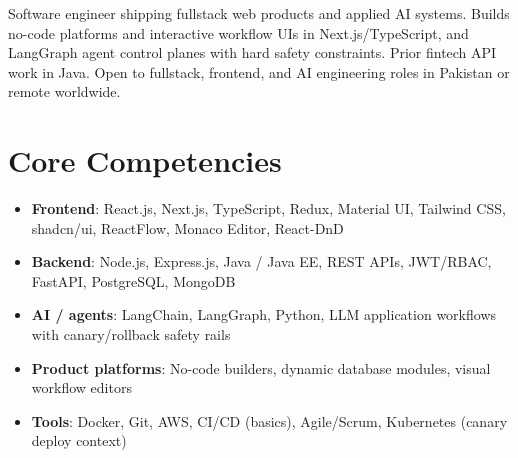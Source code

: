 \documentclass[11pt,a4paper,sans]{moderncv}
\begin{document}
\makecvtitle

\vspace{6pt}
\small{Software engineer shipping fullstack web products and applied AI systems. Builds no-code platforms and interactive workflow UIs in Next.js/TypeScript, and LangGraph agent control planes with hard safety constraints. Prior fintech API work in Java. Open to fullstack, frontend, and AI engineering roles in Pakistan or remote worldwide.}

\section{Core Competencies}
\vspace{1pt}
\begin{itemize}
\item \textbf{Frontend}: React.js, Next.js, TypeScript, Redux, Material UI, Tailwind CSS, shadcn/ui, ReactFlow, Monaco Editor, React-DnD
\item \textbf{Backend}: Node.js, Express.js, Java / Java EE, REST APIs, JWT/RBAC, FastAPI, PostgreSQL, MongoDB
\item \textbf{AI / agents}: LangChain, LangGraph, Python, LLM application workflows with canary/rollback safety rails
\item \textbf{Product platforms}: No-code builders, dynamic database modules, visual workflow editors
\item \textbf{Tools}: Docker, Git, AWS, CI/CD (basics), Agile/Scrum, Kubernetes (canary deploy context)
\end{itemize}
\end{document}
